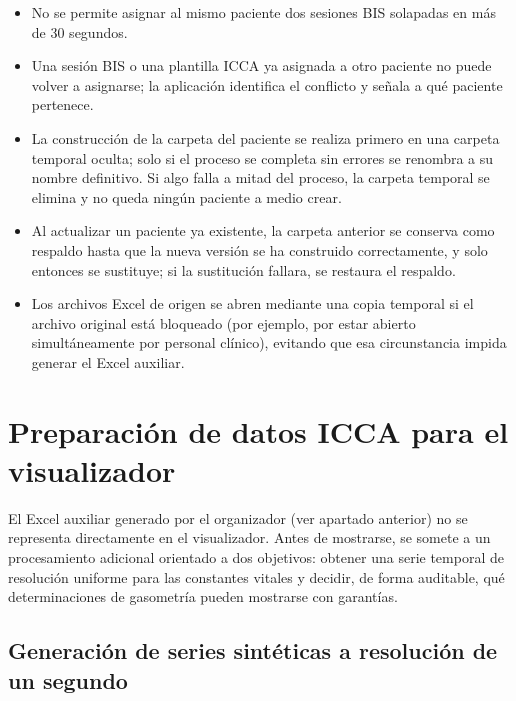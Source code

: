 \documentclass[
  spanish,
  a4paper,
  12pt,
  twoside]{memoir}
\providecommand{\tightlist}{%
  \setlength{\itemsep}{0pt}\setlength{\parskip}{0pt}}
\begin{document}
\begin{itemize}
\tightlist
\item
  No se permite asignar al mismo paciente dos sesiones BIS solapadas en
  más de 30 segundos.
\item
  Una sesión BIS o una plantilla ICCA ya asignada a otro paciente no
  puede volver a asignarse; la aplicación identifica el conflicto y
  señala a qué paciente pertenece.
\item
  La construcción de la carpeta del paciente se realiza primero en una
  carpeta temporal oculta; solo si el proceso se completa sin errores se
  renombra a su nombre definitivo. Si algo falla a mitad del proceso, la
  carpeta temporal se elimina y no queda ningún paciente a medio crear.
\item
  Al actualizar un paciente ya existente, la carpeta anterior se
  conserva como respaldo hasta que la nueva versión se ha construido
  correctamente, y solo entonces se sustituye; si la sustitución
  fallara, se restaura el respaldo.
\item
  Los archivos Excel de origen se abren mediante una copia temporal si
  el archivo original está bloqueado (por ejemplo, por estar abierto
  simultáneamente por personal clínico), evitando que esa circunstancia
  impida generar el Excel auxiliar.
\end{itemize}

\chapter{Preparación de datos ICCA para el
visualizador}\label{preparaciuxf3n-de-datos-icca-para-el-visualizador}

El Excel auxiliar generado por el organizador (ver apartado anterior) no
se representa directamente en el visualizador. Antes de mostrarse, se
somete a un procesamiento adicional orientado a dos objetivos: obtener
una serie temporal de resolución uniforme para las constantes vitales y
decidir, de forma auditable, qué determinaciones de gasometría pueden
mostrarse con garantías.

\section{Generación de series sintéticas a resolución de un
segundo}\label{generaciuxf3n-de-series-sintuxe9ticas-a-resoluciuxf3n-de-un-segundo}
\end{document}

